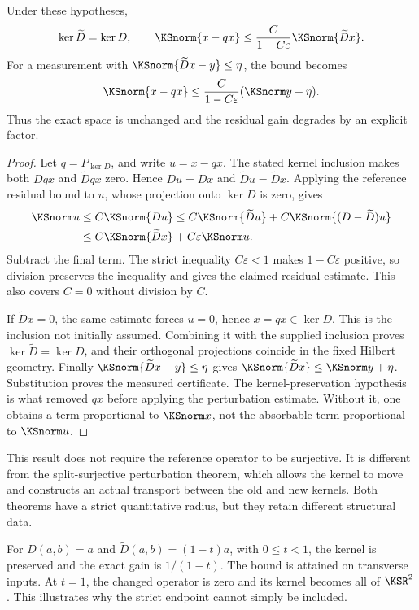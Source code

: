 \begin{KStheorem}\label{KS:KS70}
Under these hypotheses,
\[
 \ker\widetilde D=\ker D,
 \qquad
 \KSnorm{x-qx}\le\frac{C}{1-C\varepsilon}\KSnorm{\widetilde D x}.
\]
For a measurement with \(\KSnorm{\widetilde D x-y}\le\eta\), the bound becomes
\[
 \KSnorm{x-qx}\le\frac{C}{1-C\varepsilon}(\KSnorm y+\eta).
\]
Thus the exact space is unchanged and the residual gain degrades by an explicit factor.
\end{KStheorem}
\begin{proof}
Let \(q=P_{\ker D}\), and write \(u=x-qx\). The stated kernel inclusion makes both \(Dqx\) and \(\widetilde Dqx\) zero. Hence \(Du=Dx\) and \(\widetilde Du=\widetilde Dx\). Applying the reference residual bound to \(u\), whose projection onto \(\ker D\) is zero, gives
\[
 \begin{aligned}
 \KSnorm u&\le C\KSnorm{Du}
 \le C\KSnorm{\widetilde Du}+C\KSnorm{(D-\widetilde D)u}\\
 &\le C\KSnorm{\widetilde Dx}+C\varepsilon\KSnorm u.
 \end{aligned}
\]
Subtract the final term. The strict inequality \(C\varepsilon<1\) makes \(1-C\varepsilon\) positive, so division preserves the inequality and gives the claimed residual estimate. This also covers \(C=0\) without division by \(C\).

If \(\widetilde Dx=0\), the same estimate forces \(u=0\), hence \(x=qx\in\ker D\). This is the inclusion not initially assumed. Combining it with the supplied inclusion proves \(\ker\widetilde D=\ker D\), and their orthogonal projections coincide in the fixed Hilbert geometry. Finally \(\KSnorm{\widetilde Dx-y}\le\eta\) gives \(\KSnorm{\widetilde Dx}\le\KSnorm y+\eta\). Substitution proves the measured certificate. The kernel-preservation hypothesis is what removed \(qx\) before applying the perturbation estimate. Without it, one obtains a term proportional to \(\KSnorm x\), not the absorbable term proportional to \(\KSnorm u\).
\end{proof}
This result does not require the reference operator to be surjective. It is different from the split-surjective perturbation theorem, which allows the kernel to move and constructs an actual transport between the old and new kernels. Both theorems have a strict quantitative radius, but they retain different structural data.

For \(D(a,b)=a\) and \(\widetilde D(a,b)=(1-t)a\), with \(0\le t<1\), the kernel is preserved and the exact gain is \(1/(1-t)\). The bound is attained on transverse inputs. At \(t=1\), the changed operator is zero and its kernel becomes all of \(\KSR^2\). This illustrates why the strict endpoint cannot simply be included.

